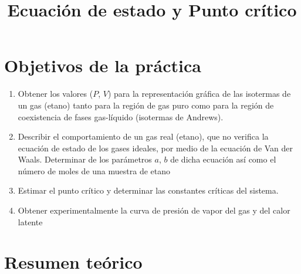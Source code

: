 \documentclass[a4paper,12pt,spanish]{article}
\begin{document}
	
	
	\title{Ecuación de estado y Punto crítico}
	
	\date{}
	
	\maketitle
	
	
	\iffalse %
	\begin{abstract} %
		
		
		Pretendemos estudiar la conservación de la energía mecánica de un sólido con rotación y desplazamiento, y la determinación del momento de inercia de la rueda de Maxwell.
		
		
		
	\end{abstract} 
	\fi
	
\iffalse
I don't want this to happen
\fi



	
	\section{Objetivos de la práctica}
	
	
	\begin{enumerate}
		\item Obtener los valores ($P$, $V$) para la representación gráfica de las isotermas de
		un gas (etano) tanto para la región de gas puro como para la región de coexistencia de fases gas-líquido (isotermas de Andrews).
		\item Describir el comportamiento de un gas real (etano), que no verifica la
		ecuación de estado de los gases ideales, por medio de la ecuación de Van der
		Waals. Determinar de los parámetros $a$, $b$ de dicha ecuación así como el
		número de moles de una muestra de etano
		\item Estimar el punto crítico y determinar las constantes críticas del sistema.
		\item Obtener experimentalmente la curva de presión de vapor del gas y del calor latente
	\end{enumerate}
	
	
	
	
	\section{Resumen teórico}
	
\end{document}
